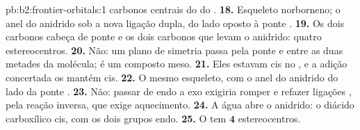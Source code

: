 \begin{solution}{pb:b2:frontier-orbitals:1}
carbonos centrais do  do .
\textbf{18.} Esqueleto norborneno; o anel do anidrido sob a nova ligação dupla,
do lado oposto à ponte .
\textbf{19.} Os dois carbonos cabeça de ponte e os dois carbonos que levam o
anidrido: quatro estereocentros.
\textbf{20.} Não: um plano de simetria passa pela ponte  e entre as duas
metades da molécula; é um composto meso.
\textbf{21.} Eles estavam cis no , e a adição concertada os mantém cis.
\textbf{22.} O mesmo esqueleto, com o anel do anidrido do lado da ponte .
\textbf{23.} Não: passar de endo a exo exigiria romper e refazer ligações
, pela reação inversa, que exige aquecimento.
\textbf{24.} A água abre o anidrido: o diácido carboxílico cis, com os dois
grupos  endo.
\textbf{25.} O  tem $\boldsymbol{4}$ estereocentros.
\end{solution}
